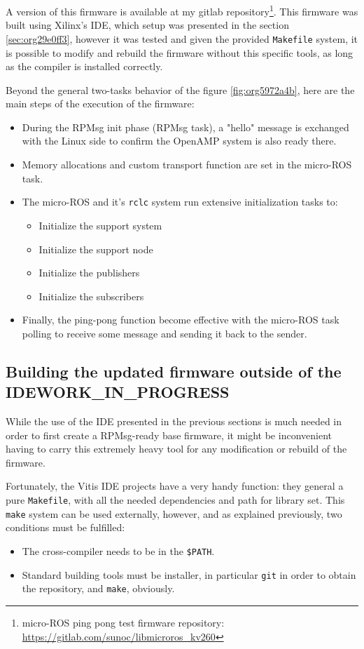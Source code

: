 \documentclass[10pt]{article}
\begin{document}
A version of this firmware is available at my gitlab repository\footnote{micro-ROS ping pong test firmware repository: \url{https://gitlab.com/sunoc/libmicroros\_kv260}}. This firmware was built using
Xilinx's IDE, which setup was presented in the section \ref{sec:org29e0ff3}, however it was tested
and given the provided \texttt{Makefile} system, it is possible to modify and rebuild the firmware
without this specific tools, as long as the compiler is installed correctly.

Beyond the general two-tasks behavior of the figure \ref{fig:org5972a4b}, here are the main steps
of the execution of the firmware:
\begin{itemize}
\item During the RPMsg init phase (RPMsg task), a "hello" message is exchanged with the Linux side
to confirm the OpenAMP system is also ready there.
\item Memory allocations and custom transport function are set in the micro-ROS task.
\item The micro-ROS and it's \texttt{rclc} system run extensive initialization tasks to:
\begin{itemize}
\item Initialize the support system
\item Initialize the support node
\item Initialize the publishers
\item Initialize the subscribers
\end{itemize}
\item Finally, the ping-pong function become effective with the micro-ROS task
polling to receive some message and sending it back to the sender.
\end{itemize}

\subsection{Building the updated firmware outside of the IDE\hfill{}\textsc{WORK\_IN\_PROGRESS}}
\label{sec:org38fcc55}
While the use of the IDE presented in the previous sections is much needed in order to first create
a RPMsg-ready base firmware, it might be inconvenient having to carry this extremely heavy tool
for any modification or rebuild of the firmware.

Fortunately, the Vitis IDE projects have a very handy function: they general a pure \texttt{Makefile}, with
all the needed dependencies and path for library set.
This \texttt{make} system can be used externally, however, and as explained previously, two conditions must be
fulfilled:
\begin{itemize}
\item The cross-compiler needs to be in the \texttt{\$PATH}.
\item Standard building tools must be installer, in particular \texttt{git} in order to obtain the repository,
and \texttt{make}, obviously.
\end{itemize}
\end{document}
